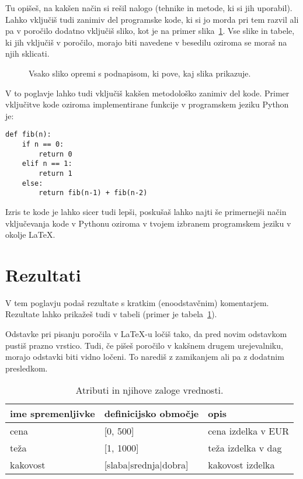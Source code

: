 \documentclass[a4paper,11pt]{article}
\begin{document}
\newpage






Tu opišeš, na kakšen način si rešil nalogo (tehnike in metode, ki si
jih uporabil). Lahko vključiš tudi zanimiv del programske kode, ki
si jo morda pri tem razvil ali pa v poročilo dodatno vključiš sliko,
kot je na primer slika~\ref{slika1}. Vse slike in tabele, ki jih
vključiš v poročilo, morajo biti navedene v besedilu oziroma se moraš
na njih sklicati.

\begin{figure}[htbp]
\begin{center}
\caption{Vsako sliko opremi s podnapisom, ki pove, kaj slika prikazuje.}
\label{slika1}
\end{center}
\end{figure}

V to poglavje lahko tudi vključiš kakšen metodološko zanimiv del
kode. Primer vključitve kode oziroma implementirane funkcije v
programskem jeziku Python je:

\begin{lstlisting}
def fib(n):
    if n == 0:
        return 0
    elif n == 1:
        return 1
    else:
        return fib(n-1) + fib(n-2)
\end{lstlisting}

Izris te kode je lahko sicer tudi lepši, poskušaš lahko najti še
primernejši način vključevanja kode v Pythonu oziroma v tvojem izbranem
programskem jeziku v okolje \LaTeX{}.

\section{Rezultati}

V tem poglavju podaš rezultate s kratkim (enoodstavčnim)
komentarjem. Rezultate lahko prikažeš tudi v tabeli (primer je
tabela~\ref{tab1}).

Odstavke pri pisanju poročila v LaTeX-u ločiš tako, da pred novim
odstavkom pustiš prazno vrstico. Tudi, če pišeš poročilo v kakšnem
drugem urejevalniku, morajo odstavki biti vidno ločeni. To narediš z
zamikanjem ali pa z dodatnim presledkom.

\begin{table}[htbp]
\caption{Atributi in njihove zaloge vrednosti.}
\label{tab1}
\begin{center}
\begin{tabular}{llp{3cm}}
\hline
ime spremenljivke & definicijsko območje & opis \\
\hline
cena & [0, 500] & cena izdelka v EUR\\
teža & [1, 1000] & teža izdelka v dag \\
kakovost & [slaba|srednja|dobra] & kakovost izdelka \\
\hline
\end{tabular}
\end{center}
\end{table}
\end{document}
